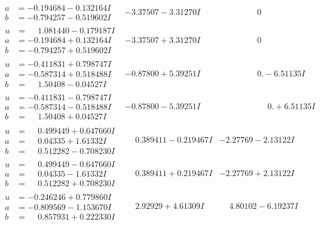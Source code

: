 \documentclass[1p]{elsarticle_modified}
\theoremstyle{definition}
\begin{document}
$$\begin{array}{c|c|c}
\begin{aligned}
a &= -0.194684 - 0.132164 I \\
b &= -0.794257 - 0.519602 I\end{aligned}
 & -3.37507 - 3.31270 I & \phantom{-0.000000 } 0 \\ \hline\begin{aligned}
u &= \phantom{-}1.081440 - 0.179187 I \\
a &= -0.194684 + 0.132164 I \\
b &= -0.794257 + 0.519602 I\end{aligned}
 & -3.37507 + 3.31270 I & \phantom{-0.000000 } 0 \\ \hline\begin{aligned}
u &= -0.411831 + 0.798747 I \\
a &= -0.587314 + 0.518488 I \\
b &= \phantom{-}1.50408 - 0.04527 I\end{aligned}
 & -0.87800 + 5.39251 I & \phantom{-0.000000 } 0. - 6.51135 I \\ \hline\begin{aligned}
u &= -0.411831 - 0.798747 I \\
a &= -0.587314 - 0.518488 I \\
b &= \phantom{-}1.50408 + 0.04527 I\end{aligned}
 & -0.87800 - 5.39251 I & \phantom{-0.000000 -}0. + 6.51135 I \\ \hline\begin{aligned}
u &= \phantom{-}0.499449 + 0.647660 I \\
a &= \phantom{-}0.04335 + 1.61332 I \\
b &= \phantom{-}0.512282 - 0.708230 I\end{aligned}
 & \phantom{-}0.389411 - 0.219467 I & -2.27769 - 2.13122 I \\ \hline\begin{aligned}
u &= \phantom{-}0.499449 - 0.647660 I \\
a &= \phantom{-}0.04335 - 1.61332 I \\
b &= \phantom{-}0.512282 + 0.708230 I\end{aligned}
 & \phantom{-}0.389411 + 0.219467 I & -2.27769 + 2.13122 I \\ \hline\begin{aligned}
u &= -0.246246 + 0.779860 I \\
a &= -0.809569 - 1.153670 I \\
b &= \phantom{-}0.857931 + 0.222330 I\end{aligned}
 & \phantom{-}2.92929 + 4.61309 I & \phantom{-}4.80102 - 6.19237 I \\ \hline\begin{aligned}

\end{aligned}
\end{array}$$
\end{document}
